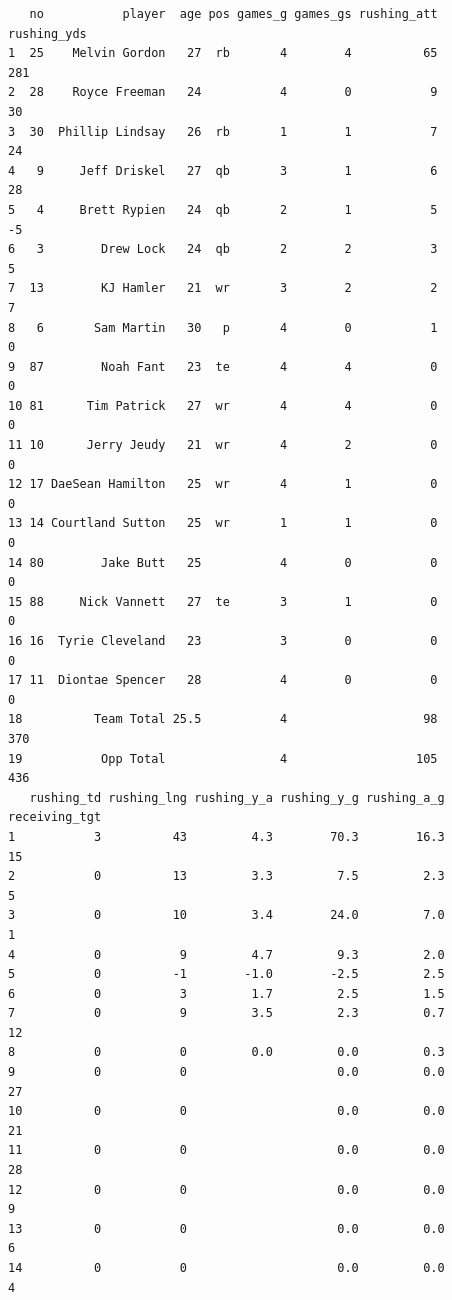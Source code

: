 \documentclass[
]{article}
\begin{document}
\begin{verbatim}
   no           player  age pos games_g games_gs rushing_att rushing_yds
1  25    Melvin Gordon   27  rb       4        4          65         281
2  28    Royce Freeman   24           4        0           9          30
3  30  Phillip Lindsay   26  rb       1        1           7          24
4   9     Jeff Driskel   27  qb       3        1           6          28
5   4     Brett Rypien   24  qb       2        1           5          -5
6   3        Drew Lock   24  qb       2        2           3           5
7  13        KJ Hamler   21  wr       3        2           2           7
8   6       Sam Martin   30   p       4        0           1           0
9  87        Noah Fant   23  te       4        4           0           0
10 81      Tim Patrick   27  wr       4        4           0           0
11 10      Jerry Jeudy   21  wr       4        2           0           0
12 17 DaeSean Hamilton   25  wr       4        1           0           0
13 14 Courtland Sutton   25  wr       1        1           0           0
14 80        Jake Butt   25           4        0           0           0
15 88     Nick Vannett   27  te       3        1           0           0
16 16  Tyrie Cleveland   23           3        0           0           0
17 11  Diontae Spencer   28           4        0           0           0
18          Team Total 25.5           4                   98         370
19           Opp Total                4                  105         436
   rushing_td rushing_lng rushing_y_a rushing_y_g rushing_a_g receiving_tgt
1           3          43         4.3        70.3        16.3            15
2           0          13         3.3         7.5         2.3             5
3           0          10         3.4        24.0         7.0             1
4           0           9         4.7         9.3         2.0              
5           0          -1        -1.0        -2.5         2.5              
6           0           3         1.7         2.5         1.5              
7           0           9         3.5         2.3         0.7            12
8           0           0         0.0         0.0         0.3              
9           0           0                     0.0         0.0            27
10          0           0                     0.0         0.0            21
11          0           0                     0.0         0.0            28
12          0           0                     0.0         0.0             9
13          0           0                     0.0         0.0             6
14          0           0                     0.0         0.0             4

\end{verbatim}
\end{document}
